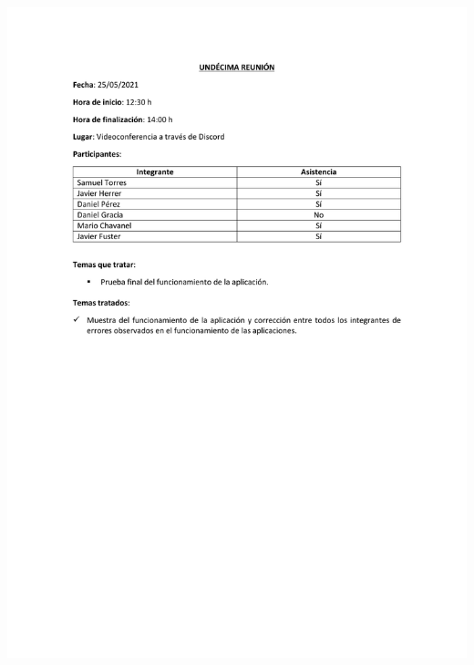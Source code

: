 \documentclass{article}
\begin{document}
\includegraphics[width=\textwidth]{../images/actas/Acta_reunion_11.pdf}
\end{document}
